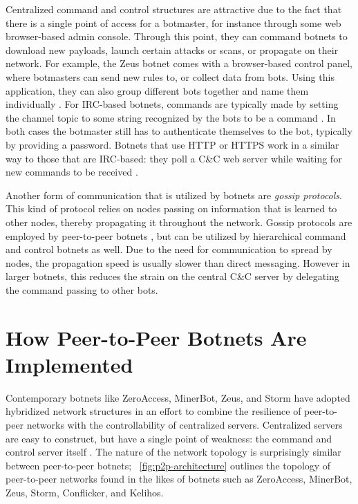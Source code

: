\documentclass{acm_proc_article-sp}
\begin{document}
Centralized command and control structures are attractive due to the fact that there is a single point of access for a botmaster, for instance through some web browser-based admin console. Through this point, they can command botnets to download new payloads, launch certain attacks or scans, or propagate on their network. For example, the Zeus botnet comes with a browser-based control panel, where botmasters can send new rules to, or collect data from bots. Using this application, they can also group different bots together and name them individually \cite{blackhat:zeus}. For IRC-based botnets, commands are typically made by setting the channel topic to some string recognized by the bots to be a command \cite{honeynet-appendix}. In both cases the botmaster still has to authenticate themselves to the bot, typically by providing a password. Botnets that use HTTP or HTTPS work in a similar way to those that are IRC-based: they poll a C\&C web server while waiting for new commands to be received \cite{borgaonkar:analysis}.

Another form of communication that is utilized by botnets are \emph{gossip protocols}. This kind of protocol relies on nodes passing on information that is learned to other nodes, thereby propagating it throughout the network. Gossip protocols are employed by peer-to-peer botnets \cite{defcon:prowling}, but can be utilized by hierarchical command and control botnets as well. Due to the need for communication to spread by nodes, the propagation speed is usually slower than direct messaging. However in larger botnets, this reduces the strain on the central C\&C server by delegating the command passing to other bots.

%
%
%

\section{How Peer-to-Peer Botnets Are Implemented}

Contemporary botnets like ZeroAccess, MinerBot, Zeus, and Storm have adopted hybridized network structures in an effort to combine the resilience of peer-to-peer networks with the controllability of centralized servers.  Centralized servers are easy to construct, but have a single point of weakness: the command and control server itself \cite{wang:p2p}.  The nature of the network topology is surprisingly similar between peer-to-peer botnets;  ~\ref{fig:p2p-architecture} outlines the topology of peer-to-peer networks found in the likes of botnets such as ZeroAccess, MinerBot, Zeus, Storm, Conflicker, and Kelihos.
\end{document}

